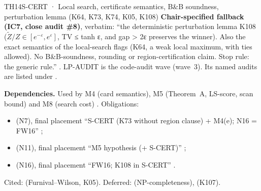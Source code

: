 \begin{card}{TH14}{S-CERT · Local search, certificate semantics, B\&B soundness, perturbation lemma (K64, K73, K74, K05, K108)}
\textbf{Chair-specified fallback (IC7, close audit \#8)}, verbatim: ``the deterministic perturbation lemma K108 ($\tilde{Z}/Z ∈ [e^{−ε}, e^{ε}]$, TV ≤ tanh ε, and gap > 2ε preserves the winner). Also the exact semantics of the local-search flags (K64, a weak local maximum, with ties allowed). No B\&B-soundness, rounding or region-certification claim. Stop rule: the generic rule.''  . LP-AUDIT is the code-audit wave (wave~3). Its named audits are listed under  .

\textbf{Dependencies.} Used by M4  (card semantics), M5  (Theorem~A, LS-score, scan bound) and M8  (search cost) . Obligations:
\begin{itemize}
\item {} (N7), final placement ``S-CERT (K73 without region clause) + M4(e); N16 = FW16'' ;
\item {} (N11), final placement ``M5 hypothesis (+ S-CERT)'' ;
\item {} (N16), final placement ``FW16; K108 in S-CERT'' .
\end{itemize}
Cited:  (Furnival--Wilson, K05). Deferred:  (NP-completeness),  (K107).


\end{card}
